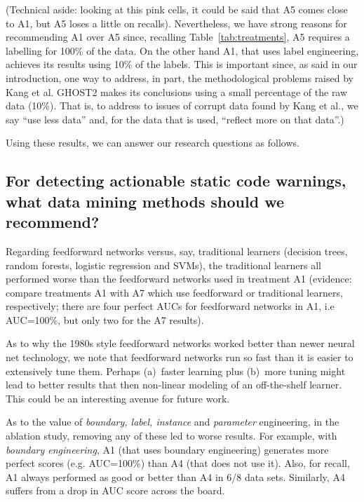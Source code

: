  (Technical aside: looking at this pink cells, it could be said that   A5 comes close to A1, but A5 loses a little on recalls).
 Nevertheless, we have strong reasons for recommending A1 over A5 since, recalling Table~\ref{tab:treatments},
 A5 requires a labelling for 100\% of the data. On the other hand A1, that uses label engineering,
 achieves its results using 10\% of the labels. This is important since, as  said in our introduction, 
one way to address, in part, the methodological problems
raised by Kang et al. GHOST2 makes its conclusions
using a small percentage of the raw data (10\%). That is,
to address to issues of corrupt data found by Kang et
al., we say ``use less data'' and, for the data that is used,
``reflect more on that data''.)
 
 Using these results,
we can answer our research questions as follows. 
 


\subsection*{  For detecting actionable static code warnings,
what data mining methods should we recommend?}
  

Regarding feedforward networks versus, say,  traditional learners (decision trees, random forests, logistic regression and SVMs), the traditional learners all performed worse than the 
feedforward networks used in treatment A1 (evidence: compare treatments
A1 with A7 which use feedforward or traditional learners, respectively; there are four perfect AUCs
for feedforward networks in A1, i.e AUC=100\%, but only two for the A7 results). 



As to why 
the 1980s style
feedforward networks worked better than newer neural net technology,  we note that feedforward networks run so fast
than it is easier to extensively tune them. Perhaps
 (a)~faster learning plus (b)~more tuning might lead to better results
that then non-linear modeling of an off-the-shelf learner.
This could be an interesting avenue for future work.

As to the value of {\em boundary, label, instance}
and {\em parameter} engineering,   in the ablation study, removing any of these led to worse results.
For example, 
with {\em boundary engineering},
   A1
(that uses boundary engineering) generates more perfect
scores (e.g. AUC=100\%) than A4 (that does not use it).
Also, for recall, A1 always performed
as good or better than A4 in 6/8 data sets. Similarly, A4 suffers from a drop in AUC score across the board.

